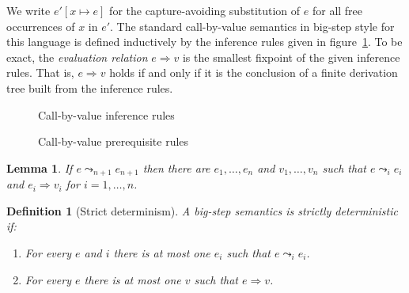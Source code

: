 \documentclass[12pt,a2paper,draft]{article}
\newcommand{\abstr}[2]{\ensuremath{\lambda{#1}.\,{#2}}}
\newcommand{\app}[2]{\ensuremath{{#1}\,{#2}}}
\newcommand{\rec}[2]{\ensuremath{{\normalfont\textsf{rec}}\,{#1}.\,{#2}}}
\newtheorem{lemma}{Lemma}
\newtheorem{definition}{Definition}
\begin{document}
We write $e'[x \mapsto e]$ for the capture-avoiding substitution of $e$ for all free occurrences
of $x$ in $e'$. The standard call-by-value semantics in big-step style for this language is
defined inductively by the inference rules given in figure~\ref{fig:Call_by_value_inference_rules}.
To be exact, the \emph{evaluation relation} $e \Rightarrow v$ is the smallest fixpoint of
the given inference rules. That is, $e \Rightarrow v$ holds if and only if it is the conclusion
of a finite derivation tree built from the inference rules.

\begin{figure}[htb]
  \centering
  \caption{Call-by-value inference rules}
  \label{fig:Call_by_value_inference_rules}
\end{figure}

\begin{figure}[htb]
  \centering
  \caption{Call-by-value prerequisite rules}
  \label{fig:Call_by_value_prerequisite_rules}
\end{figure}

\begin{lemma}
  If $e \leadsto_{n+1} e_{n+1}$ then there are $e_1,\ldots,e_n$ and
  $v_1,\ldots,v_n$ such that $e \leadsto_i e_i$ and $e_i \Rightarrow v_i$
  for $i=1,\ldots,n$.
\end{lemma}

\begin{definition}[Strict determinism]
  A big-step semantics is \emph{strictly deterministic} if:
  \begin{enumerate}
  \item For every $e$ and $i$ there is at most one $e_i$ such that $e \leadsto_i e_i$.
  \item For every $e$ there is at most one $v$ such that $e \Rightarrow v$.
  \end{enumerate}
\end{definition}
\end{document}
